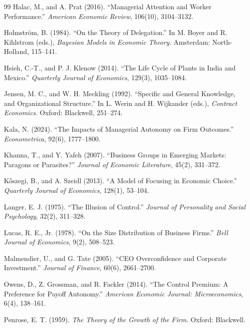 \documentclass[11pt,a4paper]{article}
\theoremstyle{plain}
\begin{document}
\begin{thebibliography}{99}
Halac, M., and A. Prat (2016). ``Managerial Attention and Worker Performance.'' \emph{American Economic Review}, 106(10), 3104--3132.

Holmstr\"om, B. (1984). ``On the Theory of Delegation.'' In M. Boyer and R. Kihlstrom (eds.), \emph{Bayesian Models in Economic Theory}. Amsterdam: North-Holland, 115--141.

Hsieh, C.-T., and P. J. Klenow (2014). ``The Life Cycle of Plants in India and Mexico.'' \emph{Quarterly Journal of Economics}, 129(3), 1035--1084.

Jensen, M. C., and W. H. Meckling (1992). ``Specific and General Knowledge, and Organizational Structure.'' In L. Werin and H. Wijkander (eds.), \emph{Contract Economics}. Oxford: Blackwell, 251--274.

Kala, N. (2024). ``The Impacts of Managerial Autonomy on Firm Outcomes.'' \emph{Econometrica}, 92(6), 1777--1800.

Khanna, T., and Y. Yafeh (2007). ``Business Groups in Emerging Markets: Paragons or Parasites?'' \emph{Journal of Economic Literature}, 45(2), 331--372.

K\H{o}szegi, B., and A. Szeidl (2013). ``A Model of Focusing in Economic Choice.'' \emph{Quarterly Journal of Economics}, 128(1), 53--104.

Langer, E. J. (1975). ``The Illusion of Control.'' \emph{Journal of Personality and Social Psychology}, 32(2), 311--328.

Lucas, R. E., Jr. (1978). ``On the Size Distribution of Business Firms.'' \emph{Bell Journal of Economics}, 9(2), 508--523.

Malmendier, U., and G. Tate (2005). ``CEO Overconfidence and Corporate Investment.'' \emph{Journal of Finance}, 60(6), 2661--2700.

Owens, D., Z. Grossman, and R. Fackler (2014). ``The Control Premium: A Preference for Payoff Autonomy.'' \emph{American Economic Journal: Microeconomics}, 6(4), 138--161.

Penrose, E. T. (1959). \emph{The Theory of the Growth of the Firm}. Oxford: Blackwell.


\end{thebibliography}
\end{document}
